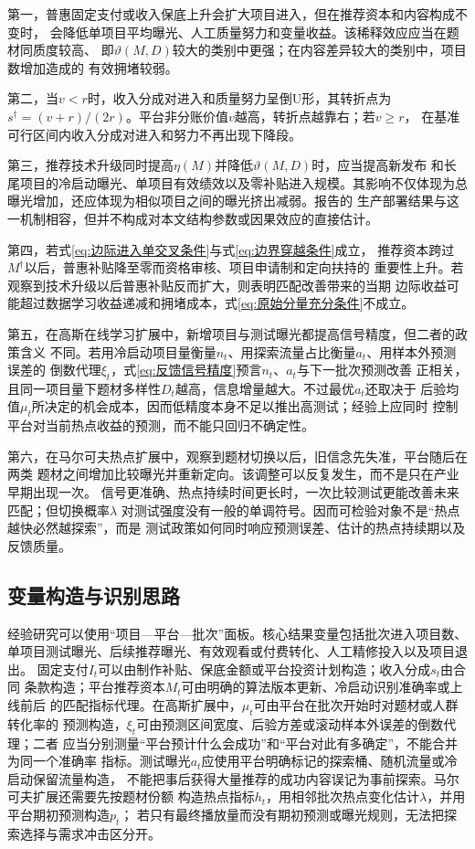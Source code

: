 \documentclass[UTF8, a4paper, 12pt, fontset=fandol]{ctexart}
\theoremstyle{definition}
\theoremstyle{remark}
\begin{document}
第一，普惠固定支付或收入保底上升会扩大项目进入，但在推荐资本和内容构成不变时，
会降低单项目平均曝光、人工质量努力和变量收益。该稀释效应应当在题材同质度较高、
即$\vartheta(M,D)$较大的类别中更强；在内容差异较大的类别中，项目数增加造成的
有效拥堵较弱。

第二，当$v<r$时，收入分成对进入和质量努力呈倒U形，其转折点为
$s^\dagger=(v+r)/(2r)$。平台非分账价值$v$越高，转折点越靠右；若$v\geq r$，
在基准可行区间内收入分成对进入和努力不再出现下降段。

第三，推荐技术升级同时提高$\eta(M)$并降低$\vartheta(M,D)$时，应当提高新发布
和长尾项目的冷启动曝光、单项目有效绩效以及零补贴进入规模。其影响不仅体现为总
曝光增加，还应体现为相似项目之间的曝光挤出减弱。\citet{zhou2026wemm}报告的
生产部署结果与这一机制相容，但并不构成对本文结构参数或因果效应的直接估计。

第四，若式\eqref{eq:边际进入单交叉条件}与式\eqref{eq:边界穿越条件}成立，
推荐资本跨过$M^\dagger$以后，普惠补贴降至零而资格审核、项目申请制和定向扶持的
重要性上升。若观察到技术升级以后普惠补贴反而扩大，则表明匹配改善带来的当期
边际收益可能超过数据学习收益递减和拥堵成本，式\eqref{eq:原始分量充分条件}不成立。

第五，在高斯在线学习扩展中，新增项目与测试曝光都提高信号精度，但二者的政策含义
不同。若用冷启动项目量衡量$n_t$、用探索流量占比衡量$a_t$、用样本外预测误差的
倒数代理$\xi_t$，式\eqref{eq:反馈信号精度}预言$n_t$、$a_t$与下一批次预测改善
正相关，且同一项目量下题材多样性$D_t$越高，信息增量越大。不过最优$a_t$还取决于
后验均值$\mu_t$所决定的机会成本，因而低精度本身不足以推出高测试；经验上应同时
控制平台对当前热点收益的预测，而不能只回归不确定性。

第六，在马尔可夫热点扩展中，观察到题材切换以后，旧信念先失准，平台随后在两类
题材之间增加比较曝光并重新定向。该调整可以反复发生，而不是只在产业早期出现一次。
信号更准确、热点持续时间更长时，一次比较测试更能改善未来匹配；但切换概率$\lambda$
对测试强度没有一般的单调符号。因而可检验对象不是“热点越快必然越探索”，而是
测试政策如何同时响应预测误差、估计的热点持续期以及反馈质量。

\subsection{变量构造与识别思路}
经验研究可以使用“项目—平台—批次”面板。核心结果变量包括批次进入项目数、
单项目测试曝光、后续推荐曝光、有效观看或付费转化、人工精修投入以及项目退出。
固定支付$I_t$可以由制作补贴、保底金额或平台投资计划构造；收入分成$s_t$由合同
条款构造；平台推荐资本$M_t$可由明确的算法版本更新、冷启动识别准确率或上线前后
的匹配指标代理。在高斯扩展中，$\mu_t$可由平台在批次开始时对题材或人群转化率的
预测构造，$\xi_t$可由预测区间宽度、后验方差或滚动样本外误差的倒数代理；二者
应当分别测量“平台预计什么会成功”和“平台对此有多确定”，不能合并为同一个准确率
指标。测试曝光$a_t$应使用平台明确标记的探索桶、随机流量或冷启动保留流量构造，
不能把事后获得大量推荐的成功内容误记为事前探索。马尔可夫扩展还需要先按题材份额
构造热点指标$h_t$，用相邻批次热点变化估计$\lambda$，并用平台期初预测构造$p_t$；
若只有最终播放量而没有期初预测或曝光规则，无法把探索选择与需求冲击区分开。
\end{document}
